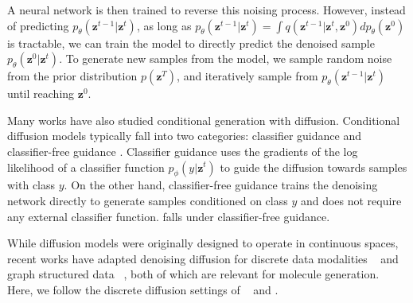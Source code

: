 A neural network is then trained to reverse this noising process. However, instead of predicting $p_{\theta}(\bm{z}^{t-1} | \bm{z}^t)$, as long as $p_{\theta}(\bm{z}^{t-1} | \bm{z}^t) = \int q(\bm{z}^{t-1} | \bm{z}^t, \bm{z}^0)dp_{\theta}(\bm{z}^0)$ is tractable, we can train the model to directly predict the denoised sample $p_{\theta}(\bm{z}^0 | \bm{z}^t)$. To generate new samples from the model, we sample random noise from the prior distribution $p(\bm{z}^T)$, and iteratively sample from $p_{\theta}(\bm{z}^{t-1} | \bm{z}^t)$ until reaching $\bm{z}^0$.

Many works have also studied conditional generation with diffusion. Conditional diffusion models typically fall into two categories: classifier guidance \citep{dhariwal2021diffusion} and classifier-free guidance \citep{ho2022classifier}. Classifier guidance uses the gradients of the log likelihood of a classifier function $p_{\phi}(y | \bm{z}^t)$ to guide the diffusion towards samples with class $y$. On the other hand, classifier-free guidance trains the denoising network directly to generate samples conditioned on class $y$ and does not require any external classifier function. \ours falls under classifier-free guidance.   

While diffusion models were originally designed to operate in continuous spaces, recent works have adapted denoising diffusion for discrete data modalities ~\citep{austin2023structureddenoisingdiffusionmodels, lou2024discretediffusionmodelingestimating} and graph structured data ~\citep{vignac2023digress, chen2023efficientdegreeguidedgraphgeneration}, both of which are relevant for molecule generation. Here, we follow the discrete diffusion settings of ~\citet{austin2023structureddenoisingdiffusionmodels} and \citet{vignac2023digress}.